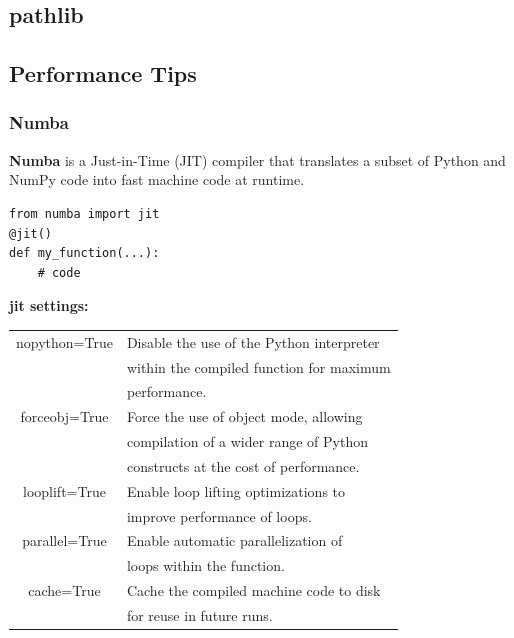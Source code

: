 \documentclass[5pt]{article}
\begin{document}
\begin{multicols}{2}
\subsection{pathlib}

\subsection{Performance Tips}
\subsubsection{Numba}
\textbf{Numba} is a Just-in-Time (JIT) compiler that translates a subset of Python and NumPy code into fast machine code at runtime.
\begin{verbatim}
from numba import jit
@jit()
def my_function(...):
    # code
\end{verbatim}
\textbf{jit settings:}\\
\begin{tabular}{C L}
    nopython=True       & Disable the use of the Python interpreter\\
                        & within the compiled function for maximum\\
                        & performance.\\
    forceobj=True       & Force the use of object mode, allowing\\
                        & compilation of a wider range of Python\\
                        & constructs at the cost of performance.\\
    looplift=True       & Enable loop lifting optimizations to\\
                        & improve performance of loops.\\
    parallel=True       & Enable automatic parallelization of\\
                        & loops within the function.\\
    cache=True          & Cache the compiled machine code to disk\\
                        & for reuse in future runs.\\
\end{tabular}


\end{multicols}
\end{document}
